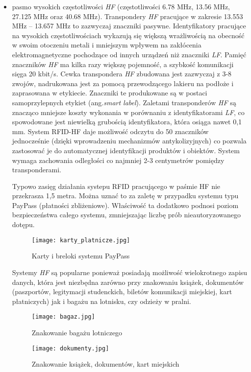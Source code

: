 \begin{itemize}
	\item pasmo wysokich częstotliwości \emph{HF} (częstotliwości 6.78 MHz, 13.56 MHz, 27.125 MHz oraz 40.68 MHz). 
Transpondery \emph{HF} pracujące w zakresie 13.553 MHz – 13.657 MHz to zazwyczaj znaczniki pasywne. Identyfikatory pracujące na wysokich częstotliwościach wykazują się większą wrażliwością na obecność w swoim otoczeniu metali i mniejszym wpływem na zakłócenia elektromagnetyczne pochodzące od innych urządzeń niż znaczniki \emph{LF}. Pamięć znaczników \emph{HF} ma kilka razy większę pojemność, a szybkość komunikacji sięga 20 kbit/s. Cewka transpondera \emph{HF} zbudowana jest zazwyczaj z 3-8 zwojów, nadrukowana jest za pomocą przewodzącego lakieru na podłoże i zaprasowana w etykiecie. Znaczniki te produkowane są w postaci samoprzylepnych etykiet (ang.\emph{smart label}). Zaletami transponderów \emph{HF} są znacząco mniejsze koszty wykonania w porównaniu z identyfikatorami \emph{LF}, co spowodowane jest niewielką grubością identyfikatora, która osiąga nawet 0,1 mm. System RFID-HF daje możliwość odczytu do 50 znaczników jednocześnie (dzięki wprowadzeniu mechanizmów antykolizyjnych) co pozwala zastosować je do automatycznej identyfikacji produktów i obiektów. System wymaga zachowania odległości co najmniej 2-3 centymetrów pomiędzy transponderami. 
	
	Typowo zasięg działania systepu RFID pracującego w paśmie HF nie przekrasza 1,5 metra. Można uznać to za zaletę w przypadku systemu typu PayPass (płatności zbliżeniowe). Właściwość ta dodatkowo podnosi poziom bezpieczeństwa całego systemu, zmniejszając liczbę prób nieautoryzowanego dotępu.  

	\begin{figure}[h!]
	\centering
	    \texttt{[image: karty\_platnicze.jpg]}
	    \caption{Karty i breloki systemu PayPass}
	\end{figure}

	Systemy \emph{HF} są popularne ponieważ posiadają możliwość wielokrotnego zapisu danych, która jest niezbędna zarówno przy znakowaniu książek, dokumentów (paszportów, legitymacji studenckich, biletów komunikacji miejskiej, kart płatniczych) jak i bagażu na lotnisku, czy odzieży w pralni.

	\begin{figure}[h!]
	\centering
	    \texttt{[image: bagaz.jpg]}
	    \caption{Znakowanie bagażu lotniczego}
	\end{figure}

	\begin{figure}[h!]
	\centering
	    \texttt{[image: dokumenty.jpg]}
	    \caption{Znakowanie książek, dokumentów, kart miejskich}
	\end{figure}
	

\end{itemize}
